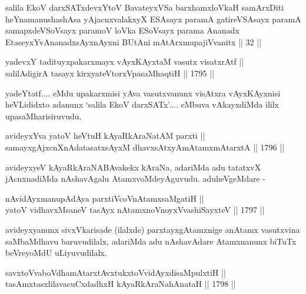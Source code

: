 \begin{shl}
salila EkoV darxSATxdevxYtoV BavateyxVSa barxhamxloVkaH samArxDiti heYnamanushashAsa yAjacnxvalakxyX ESAsayx paramA gatireVSAsayx paramA samapxdeVSoV\s sayx paramoV loVka ESoV\s sayx parama Ananadx EtaseyxYvAnanadxsAyxnAyxni BUtAni mAtArxmupajiVvanitx || 32 ||
\end{shl}

\begin{shl}
yadevxY tadituyxpakarxmayx vAyxKAyxtaM vasutx visatxrAtf || \\
salilAdigirA tasayx kirxyateV\s torxVpasaMhaqtiH ||  1795 ||  
\end{shl}

\begin{artha}
yadeYtatf.... eMdu upakarxmisi yAva vasutxvanunx visAtxra vAyxKAyxnisi
heVLididxto adanunx `salila EkoV darxSATx'.... eMbuva vAkayxdiMda ililx
upasaMharisiruvudu.
\end{artha}

\begin{shl}
avideyxYva yatoV heVtuH kAyaRkAraNatAM parxti || \\
samayxgAjxcnXnAdatasatxsAyxM dhavxsAtxyAmAtamxmAtarxtA ||  1796 ||  
\end{shl}

\begin{artha}
avideyxyeV kAyaRkAraNABAvakekx kAraNa, adariMda adu tatatxvX
jAcnxnadiMda nAshavAgalu AtamxvoMdeyAguvudu. aduheVgeMdare -
\end{artha}

\begin{shl}
nAvidAyxmanupAdAya parxtiVcoV\s nAtamxsaMgatiH || \\
yatoV vidhavxMsaneV tasAyx nA\s \s tamxnoV\s noyxV\s vashiSayxteV ||  1797 ||  
\end{shl}	

\begin{artha}
avideyxyanunx sivxVkarisade (ilalxde) parxtayxgAtamxnige anAtamx
vasutxvina saMbaMdhavu baruvudilalx, adariMda adu nAshavAdare
Atamxnanunx biTuTx beVreyoMdU uLiyuvudilalx.
\end{artha}


\begin{shl}
savxtoV\s vaboVdhamAtarxtAvxtukxtoV\s vidAyxdisaMpulxtiH || \\
tasAmxtasxlilavacuCxdadhxH kAyaRkAraNahAnataH ||  1798 ||  
\end{shl}

